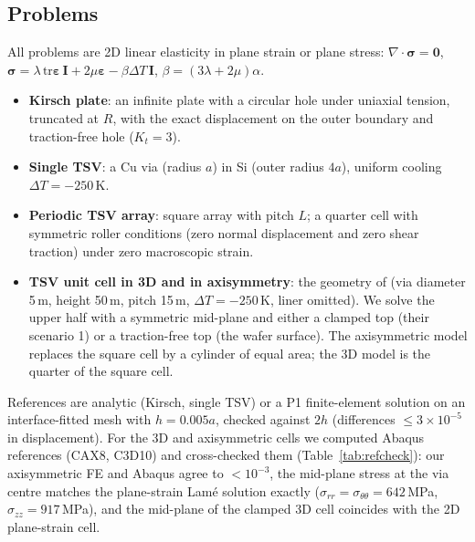 \documentclass[11pt]{article}
\theoremstyle{remark}\newtheorem*{remark}{Remark}
\begin{document}
\subsection{Problems}
All problems are 2D linear elasticity in plane strain or plane stress:
$\nabla\cdot\bm\sigma=\bm 0$, $\bm\sigma=\lambda\,\mathrm{tr}\bm\varepsilon\,\bm I+2\mu\bm\varepsilon-\beta\Delta T\,\bm I$,
$\beta=(3\lambda+2\mu)\alpha$.
\begin{itemize}
  \item \textbf{Kirsch plate}: an infinite plate with a circular hole under uniaxial tension, truncated at $R$,
        with the exact displacement on the outer boundary and traction-free hole ($K_t=3$).
  \item \textbf{Single TSV}: a Cu via (radius $a$) in Si (outer radius $4a$), uniform cooling $\Delta T=-250$\,K.
  \item \textbf{Periodic TSV array}: square array with pitch $L$; a quarter cell with symmetric roller conditions
        (zero normal displacement and zero shear traction) under zero macroscopic strain.
  \item \textbf{TSV unit cell in 3D and in axisymmetry}: the geometry of \citet{zhu2025morestress}
        (via diameter 5\,\textmu m, height 50\,\textmu m, pitch 15\,\textmu m, $\Delta T=-250$\,K, liner omitted).
        We solve the upper half with a symmetric mid-plane and either a clamped top (their scenario 1) or a
        traction-free top (the wafer surface). The axisymmetric model replaces the square cell by a cylinder of equal
        area; the 3D model is the quarter of the square cell.
\end{itemize}
References are analytic (Kirsch, single TSV) or a P1 finite-element solution on an interface-fitted mesh with
$h=0.005a$, checked against $2h$ (differences $\le 3\times10^{-5}$ in displacement).
For the 3D and axisymmetric cells we computed Abaqus references (CAX8, C3D10) and cross-checked them
(Table~\ref{tab:refcheck}): our axisymmetric FE and Abaqus agree to $<10^{-3}$, the mid-plane stress at the via
centre matches the plane-strain Lam\'e solution exactly ($\sigma_{rr}=\sigma_{\theta\theta}=642$\,MPa,
$\sigma_{zz}=917$\,MPa), and the mid-plane of the clamped 3D cell coincides with the 2D plane-strain cell.
\end{document}
